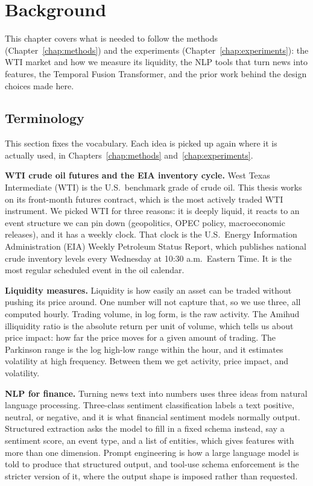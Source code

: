 \chapter{Background}\label{chap:background}

This chapter covers what is needed to follow the methods (Chapter~\ref{chap:methods}) and the experiments (Chapter~\ref{chap:experiments}): the WTI market and how we measure its liquidity, the NLP tools that turn news into features, the Temporal Fusion Transformer, and the prior work behind the design choices made here.

\section{Terminology}\label{sec:terminology}

This section fixes the vocabulary. Each idea is picked up again where it is actually used, in Chapters~\ref{chap:methods} and~\ref{chap:experiments}.

\textbf{WTI crude oil futures and the EIA inventory cycle.} West Texas Intermediate (WTI) is the U.S.\ benchmark grade of crude oil. This thesis works on its front-month futures contract, which is the most actively traded WTI instrument. We picked WTI for three reasons: it is deeply liquid, it reacts to an event structure we can pin down (geopolitics, OPEC policy, macroeconomic releases), and it has a weekly clock. That clock is the U.S.\ Energy Information Administration (EIA) Weekly Petroleum Status Report, which publishes national crude inventory levels every Wednesday at 10:30 a.m.\ Eastern Time. It is the most regular scheduled event in the oil calendar.

\textbf{Liquidity measures.} Liquidity is how easily an asset can be traded without pushing its price around. One number will not capture that, so we use three, all computed hourly. Trading volume, in log form, is the raw activity. The Amihud illiquidity ratio \citep{amihud2002} is the absolute return per unit of volume, which tells us about price impact: how far the price moves for a given amount of trading. The Parkinson range \citep{parkinson1980} is the log high-low range within the hour, and it estimates volatility at high frequency. Between them we get activity, price impact, and volatility.

\textbf{NLP for finance.} Turning news text into numbers uses three ideas from natural language processing. Three-class sentiment classification labels a text positive, neutral, or negative, and it is what financial sentiment models normally output. Structured extraction asks the model to fill in a fixed schema instead, say a sentiment score, an event type, and a list of entities, which gives features with more than one dimension. Prompt engineering is how a large language model is told to produce that structured output, and tool-use schema enforcement is the stricter version of it, where the output shape is imposed rather than requested.

